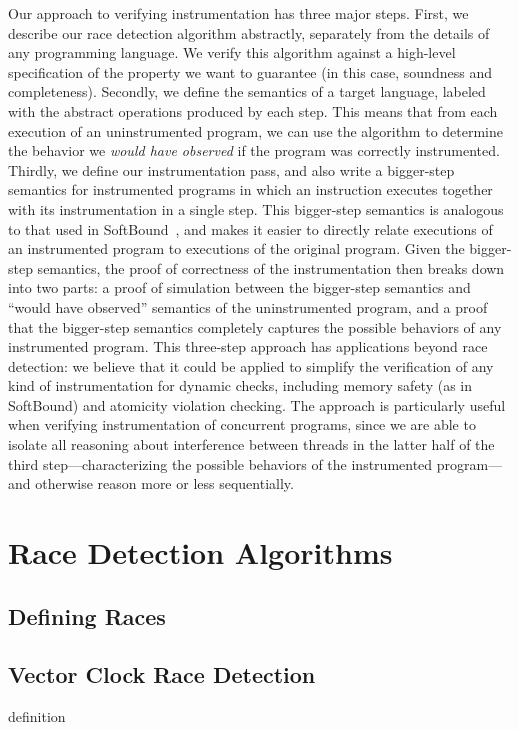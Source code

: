 \documentclass[preprint, 10pt]{sigplanconf}
\begin{document}
Our approach to verifying instrumentation has three major steps. First, we describe our race detection algorithm abstractly, separately from the details of any programming language. We verify this algorithm against a high-level specification of the property we want to guarantee (in this case, soundness and completeness). Secondly, we define the semantics of a target language, labeled with the abstract operations produced by each step. This means that from each execution of an uninstrumented program, we can use the algorithm to determine the behavior we \emph{would have observed} if the program was correctly instrumented. Thirdly, we define our instrumentation pass, and also write a bigger-step semantics for instrumented programs in which an instruction executes together with its instrumentation in a single step. This bigger-step semantics is analogous to that used in SoftBound~\cite{softbound}, and makes it easier to directly relate executions of an instrumented program to executions of the original program. Given the bigger-step semantics, the proof of correctness of the instrumentation then breaks down into two parts: a proof of simulation between the bigger-step semantics and ``would have observed'' semantics of the uninstrumented program, and a proof that the bigger-step semantics completely captures the possible behaviors of any instrumented program. This three-step approach has applications beyond race detection: we believe that it could be applied to simplify the verification of any kind of instrumentation for dynamic checks, including memory safety (as in SoftBound) and atomicity violation checking. The approach is particularly useful when verifying instrumentation of concurrent programs, since we are able to isolate all reasoning about interference between threads in the latter half of the third step---characterizing the possible behaviors of the instrumented program---and otherwise reason more or less sequentially.

\section{Race Detection Algorithms}
\label{algorithms}

\subsection{Defining Races}


\subsection{Vector Clock Race Detection}
definition
\end{document}
